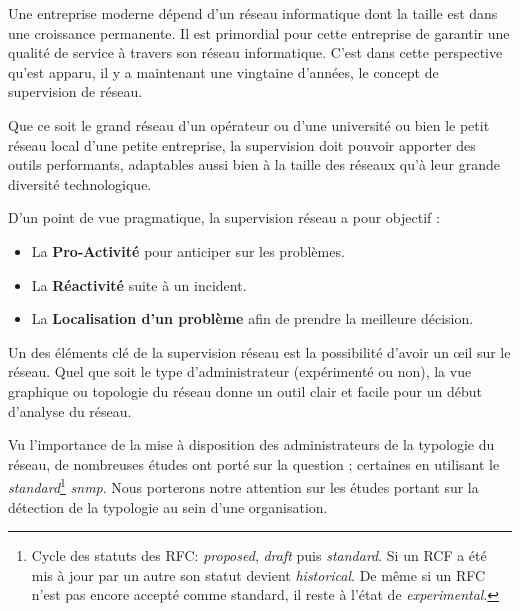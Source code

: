 \introduction
Une entreprise moderne dépend d'un réseau informatique dont la taille est dans une croissance permanente. Il est primordial pour cette entreprise de garantir une qualité de service à travers son réseau informatique. C'est dans cette perspective qu'est apparu, il y a maintenant une vingtaine d'années, le concept de supervision de réseau.

Que ce soit le grand réseau d'un opérateur ou d'une université ou bien le petit réseau local d'une petite entreprise, la supervision
doit pouvoir apporter des outils performants, adaptables aussi bien à la taille des réseaux qu'à leur grande diversité technologique.

D'un point de vue pragmatique, la supervision réseau a pour objectif :
\begin{itemize}
\item La \textbf{Pro-Activité} pour anticiper sur les problèmes.
\item La \textbf{Réactivité} suite à un incident.
\item La \textbf{Localisation d'un problème} afin de prendre la meilleure décision.
\end{itemize}

Un des éléments clé de la supervision réseau est la possibilité d'avoir un œil sur le réseau. Quel que soit le type d'administrateur (expérimenté ou non), la vue graphique ou topologie du réseau donne un outil clair et facile pour un début d'analyse du réseau. 

Vu l'importance de la mise à disposition des administrateurs de la typologie du réseau, de nombreuses études ont porté sur la question ; certaines en utilisant  le  \emph{standard}\footnote{Cycle des statuts des RFC: \emph{proposed}, \emph{draft} puis \emph{standard}. Si un RCF a été mis à jour par un autre son statut devient \emph{historical}. De même si un RFC n'est pas encore accepté comme standard, il reste à l'état de \emph{experimental}.} \emph{\gls*{snmp}}. Nous porterons notre attention sur les études portant sur la détection de la typologie au sein d'une organisation.

